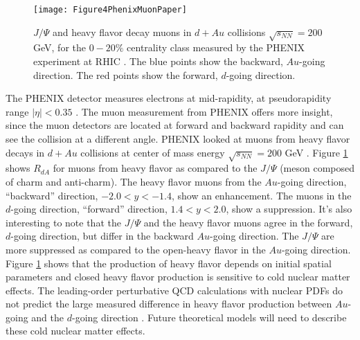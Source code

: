 
\begin{figure}[h]
  \centering
  \texttt{[image: Figure4PhenixMuonPaper]}\\
  \caption{$J/\Psi$ and heavy flavor decay muons in $d+Au$ collisions $\sqrt{s_{NN}} = 200$ GeV, for the $0-20\%$ centrality class measured by the PHENIX experiment at RHIC \cite{Adare:2013lkk}. The blue points show the backward, $Au$-going direction. The red points show the forward, $d$-going direction.} \label{fig:Figure4PhenixMuonPaper}
\end{figure}

The PHENIX detector measures electrons at mid-rapidity, at pseudorapidity range $| \eta | < 0.35$ \cite{Adare:2012yxa}. The muon measurement from PHENIX offers more insight, since the muon detectors are located at forward and backward rapidity and can see the collision at a different angle. PHENIX looked at muons from heavy flavor decays in $d+Au$ collisions at center of mass energy $\sqrt{s_{NN}} = 200$ GeV \cite{Adare:2013lkk}. Figure \ref{fig:Figure4PhenixMuonPaper} \cite{Adare:2013lkk} shows $R_{dA}$ for muons from heavy flavor as compared to the $J/\Psi$ (meson composed of charm and anti-charm). The heavy flavor muons from the $Au$-going direction, ``backward'' direction, $- 2.0 < y < -1.4$, show an enhancement. The muons in the $d$-going direction, ``forward'' direction, $1.4 < y < 2.0$, show a suppression. It's also interesting to note that the $J/\Psi$ and the heavy flavor muons agree in the forward, $d$-going direction, but differ in the backward $Au$-going direction. The $J/\Psi$ are more suppressed as compared to the open-heavy flavor in the $Au$-going direction. Figure \ref{fig:Figure4PhenixMuonPaper} shows that the production of heavy flavor depends on initial spatial parameters and closed heavy flavor production is sensitive to cold nuclear matter effects. The leading-order perturbative QCD calculations with nuclear PDFs do not predict the large measured difference in heavy flavor production between $Au$-going and the $d$-going direction \cite{Adare:2013lkk}. Future theoretical models will need to describe these cold nuclear matter effects.




